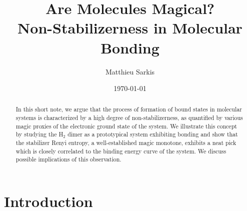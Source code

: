 \documentclass[aps, prl, twocolumn, groupedaddress, reprint, floatfix, nofootinbib, longbibliography]{revtex4-2}
\begin{document}
    \title{Are Molecules Magical?\\[0.2em]
    \small Non-Stabilizerness in Molecular Bonding}
    \author{Matthieu Sarkis}
    \date{\today}

\begin{abstract}
    In this short note, we argue that the process of formation of bound states in molecular systems is characterized by a high degree of non-stabilizerness, as quantified by various magic proxies of the electronic ground state of the system. We illustrate this concept by studying the H$_2$ dimer as a prototypical system exhibiting bonding and show that the stabilizer Renyi entropy, a well-established magic monotone, exhibits a neat pick which is closely correlated to the binding energy curve of the system. We discuss possible implications of this observation.
\end{abstract}

\maketitle

\section{Introduction}
\end{document}
